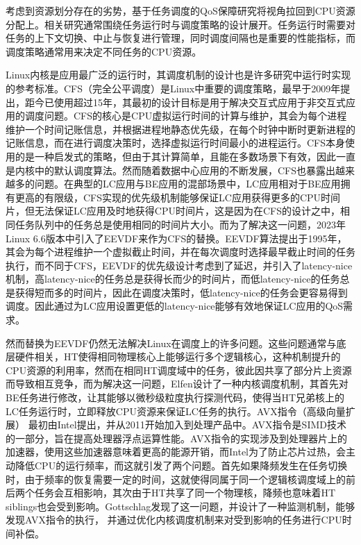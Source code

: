 
考虑到资源划分存在的劣势，基于任务调度的QoS保障研究将视角拉回到CPU资源分配上。相关研究通常围绕任务运行时与调度策略的设计展开。任务运行时需要对任务的上下文切换、中止与恢复进行管理，同时调度间隔也是重要的性能指标，而调度策略通常用来决定不同任务的CPU资源。

Linux内核是应用最广泛的运行时，其调度机制的设计也是许多研究中运行时实现的参考标准。CFS（完全公平调度）\citep{pabla2009completely}是Linux中重要的调度策略，最早于2009年提出，距今已使用超过15年，其最初的设计目标是用于解决交互式应用于非交互式应用的调度问题。CFS的核心是CPU虚拟运行时间的计算与维护，其会为每个进程维护一个时间记账信息，并根据进程地静态优先级，在每个时钟中断时更新进程的记账信息，而在进行调度决策时，选择虚拟运行时间最小的进程运行。CFS本身使用的是一种启发式的策略，但由于其计算简单，且能在多数场景下有效，因此一直是内核中的默认调度算法。然而随着数据中心应用的不断发展，CFS也暴露出越来越多的问题。在典型的LC应用与BE应用的混部场景中，LC应用相对于BE应用拥有更高的有限级，CFS实现的优先级机制能够保证LC应用获得更多的CPU时间片，但无法保证LC应用及时地获得CPU时间片，这是因为在CFS的设计之中，相同任务队列中的任务总是使用相同的时间片大小。而为了解决这一问题，2023年Linux 6.6版本中引入了EEVDF来作为CFS的替换。EEVDF算法\citep{stoica1995earliest}提出于1995年，其会为每个进程维护一个虚拟截止时间，并在每次调度时选择最早截止时间的任务执行，而不同于CFS，EEVDF的优先级设计考虑到了延迟，并引入了latency-nice机制，高latency-nice的任务总是获得长而少的时间片，而低latency-nice的任务总是获得短而多的时间片，因此在调度决策时，低latency-nice的任务会更容易得到调度。因此通过为LC应用设置更低的latency-nice能够有效地保证LC应用的QoS需求。

然而替换为EEVDF仍然无法解决Linux在调度上的许多问题。这些问题通常与底层硬件相关，HT使得相同物理核心上能够运行多个逻辑核心，这种机制提升的CPU资源的利用率，然而在相同HT调度域中的任务，彼此因共享了部分片上资源而导致相互竞争，而为解决这一问题，Elfen\citep{yang2016elfen}设计了一种内核调度机制，其首先对BE任务进行修改，让其能够以微秒级粒度执行探测代码，使得当HT兄弟核上的LC任务运行时，立即释放CPU资源来保证LC任务的执行。AVX指令（高级向量扩展）\citep{guide2011intel} 最初由Intel提出，并从2011开始加入到处理产品中。AVX指令是SIMD技术的一部分，旨在提高处理器浮点运算性能。AVX指令的实现涉及到处理器片上的加速器，使用这些加速器意味着更高的能源开销，而Intel为了防止芯片过热，会主动降低CPU的运行频率，而这就引发了两个问题。首先如果降频发生在任务切换时，由于频率的恢复需要一定的时间，这就使得同属于同一个逻辑核调度域上的前后两个任务会互相影响，其次由于HT共享了同一个物理核，降频也意味着HT siblings也会受到影响。Gottschlag\citep{gottschlag2020avx}发现了这一问题，并设计了一种监测机制，能够发现AVX指令的执行， 并通过优化内核调度机制来对受到影响的任务进行CPU时间补偿。

